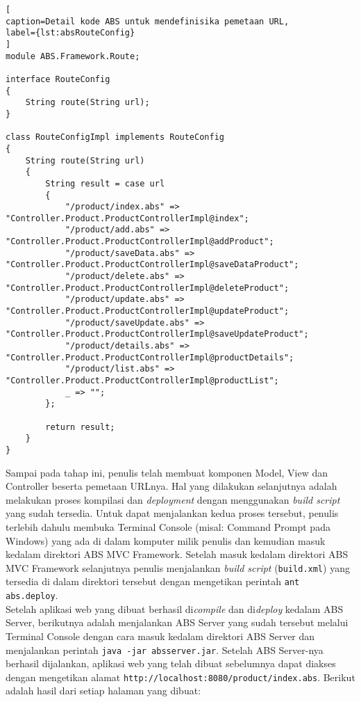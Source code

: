 \begin{lstlisting}[
caption=Detail kode ABS untuk mendefinisika pemetaan URL,
label={lst:absRouteConfig}
]
module ABS.Framework.Route;

interface RouteConfig
{
	String route(String url);
}

class RouteConfigImpl implements RouteConfig
{
	String route(String url)
	{
		String result = case url
		{
			"/product/index.abs" => "Controller.Product.ProductControllerImpl@index";
			"/product/add.abs" => "Controller.Product.ProductControllerImpl@addProduct";
			"/product/saveData.abs" => "Controller.Product.ProductControllerImpl@saveDataProduct";
			"/product/delete.abs" => "Controller.Product.ProductControllerImpl@deleteProduct";
			"/product/update.abs" => "Controller.Product.ProductControllerImpl@updateProduct";
			"/product/saveUpdate.abs" => "Controller.Product.ProductControllerImpl@saveUpdateProduct";
			"/product/details.abs" => "Controller.Product.ProductControllerImpl@productDetails";
			"/product/list.abs" => "Controller.Product.ProductControllerImpl@productList";
			_ => "";
		};
		
		return result;
	}
}
\end{lstlisting}

Sampai pada tahap ini, penulis telah membuat komponen Model, View dan Controller beserta pemetaan URLnya. Hal yang dilakukan selanjutnya adalah melakukan proses kompilasi dan \textit{deployment} dengan menggunakan \textit{build script} yang sudah tersedia. Untuk dapat menjalankan kedua proses tersebut, penulis terlebih dahulu membuka Terminal Console (misal: Command Prompt pada Windows) yang ada di dalam komputer milik penulis dan kemudian masuk kedalam direktori ABS MVC Framework. Setelah masuk kedalam direktori ABS MVC Framework selanjutnya penulis menjalankan \textit{build script} (\texttt{build.xml}) yang tersedia di dalam direktori tersebut dengan mengetikan perintah \texttt{ant abs.deploy}.\\

Setelah aplikasi web yang dibuat berhasil di\textit{compile} dan di\textit{deploy} kedalam ABS Server, berikutnya adalah menjalankan ABS Server yang sudah tersebut melalui Terminal Console dengan cara masuk kedalam direktori ABS Server dan menjalankan perintah \texttt{java -jar absserver.jar}. Setelah ABS Server-nya berhasil dijalankan, aplikasi web yang telah dibuat sebelumnya dapat diakses dengan mengetikan alamat \texttt{http://localhost:8080/product/index.abs}. Berikut adalah hasil dari setiap halaman yang dibuat:



